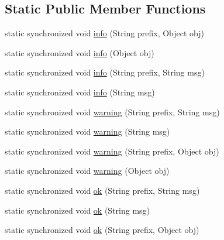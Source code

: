 \subsection*{Static Public Member Functions}
\begin{DoxyCompactItemize}
\item 
static synchronized void \hyperlink{classit_1_1emarolab_1_1cagg_1_1debugging_1_1StandaloneDebuggingText_1_1Logger_a7987ddc75449e99feb8091836e29455a}{info} (String prefix, Object obj)
\item 
static synchronized void \hyperlink{classit_1_1emarolab_1_1cagg_1_1debugging_1_1StandaloneDebuggingText_1_1Logger_a7faf5d3c41621fd95ef884dadaa3ab69}{info} (Object obj)
\item 
static synchronized void \hyperlink{classit_1_1emarolab_1_1cagg_1_1debugging_1_1StandaloneDebuggingText_1_1Logger_a061cde2efebc266fc35867d75f7ffa1f}{info} (String prefix, String msg)
\item 
static synchronized void \hyperlink{classit_1_1emarolab_1_1cagg_1_1debugging_1_1StandaloneDebuggingText_1_1Logger_a331e571ed950b07fc00cdf5cd2da43af}{info} (String msg)
\item 
static synchronized void \hyperlink{classit_1_1emarolab_1_1cagg_1_1debugging_1_1StandaloneDebuggingText_1_1Logger_a125c92b20f717a04b5e96ae9513668f1}{warning} (String prefix, String msg)
\item 
static synchronized void \hyperlink{classit_1_1emarolab_1_1cagg_1_1debugging_1_1StandaloneDebuggingText_1_1Logger_a2da5bf42026d330da181a976d46fbd62}{warning} (String msg)
\item 
static synchronized void \hyperlink{classit_1_1emarolab_1_1cagg_1_1debugging_1_1StandaloneDebuggingText_1_1Logger_a1651b7685a00b503e11f1fae52743986}{warning} (String prefix, Object obj)
\item 
static synchronized void \hyperlink{classit_1_1emarolab_1_1cagg_1_1debugging_1_1StandaloneDebuggingText_1_1Logger_a00ac411098daa3c826e0bba7d429feb3}{warning} (Object obj)
\item 
static synchronized void \hyperlink{classit_1_1emarolab_1_1cagg_1_1debugging_1_1StandaloneDebuggingText_1_1Logger_aaca31ba3b557d484040ae28f7f4e9d84}{ok} (String prefix, String msg)
\item 
static synchronized void \hyperlink{classit_1_1emarolab_1_1cagg_1_1debugging_1_1StandaloneDebuggingText_1_1Logger_ab71a536d4e675cbc95d63868a8560550}{ok} (String msg)
\item 
static synchronized void \hyperlink{classit_1_1emarolab_1_1cagg_1_1debugging_1_1StandaloneDebuggingText_1_1Logger_af3beb37a58f8c9e84118e636bbc7e216}{ok} (String prefix, Object obj)

\end{DoxyCompactItemize}
